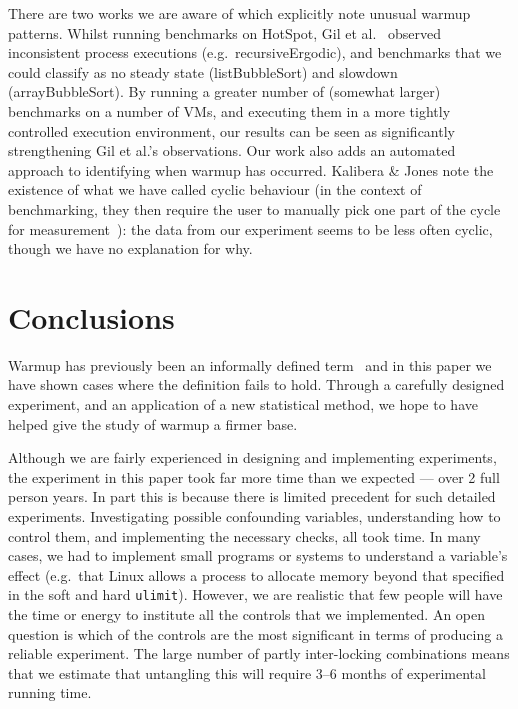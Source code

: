 \documentclass[preprint,numbers,10pt]{sigplanconf}
\newcommand{\kalibera}{Kalibera \& Jones\xspace}
\begin{document}
There are two works we are aware of which explicitly note unusual warmup
patterns. Whilst running benchmarks on HotSpot, Gil et
al.~\cite{gil11microbenchmark} observed inconsistent process executions
(e.g.~recursiveErgodic), and benchmarks that we could classify as no
steady state (listBubbleSort) and slowdown (arrayBubbleSort). By running a
greater number of (somewhat larger) benchmarks on a number of VMs, and executing
them in a more tightly controlled execution environment, our results can be seen
as significantly strengthening Gil et al.'s observations. Our work also adds an
automated approach to identifying when warmup has occurred.
\kalibera note the
existence of what we have called cyclic behaviour (in the context of benchmarking,
they then require the user to
manually pick one part of the cycle for measurement~\cite{kalibera13rigorous}):
the data from our experiment seems to be less often cyclic, though we have no
explanation for why.


\section{Conclusions}
\label{sec:conclusion}

Warmup has previously been an informally defined term~\cite{seaton15phd} and in this
paper we have shown cases where the definition fails to hold. Through a carefully
designed experiment, and an application of a new statistical method, we hope
to have helped give the study of warmup a firmer base.

Although we are fairly experienced in designing and implementing
experiments, the experiment in this paper took far more time than we expected
--- over 2 full person years. In part this is because there is limited precedent for such detailed
experiments. Investigating possible confounding variables, understanding how to
control them, and implementing the necessary checks, all took time. In many
cases, we had to implement small programs or systems to understand a variable's
effect (e.g.~that Linux allows a process to allocate memory beyond that
specified in the soft and hard \texttt{ulimit}). However, we are realistic that
few people will have the time or energy to institute all the controls that we
implemented. An open question is which of the controls are the most significant
in terms of producing a reliable experiment. The large number of partly
inter-locking combinations means that we estimate that untangling this will
require 3--6 months of experimental running time.
\end{document}
